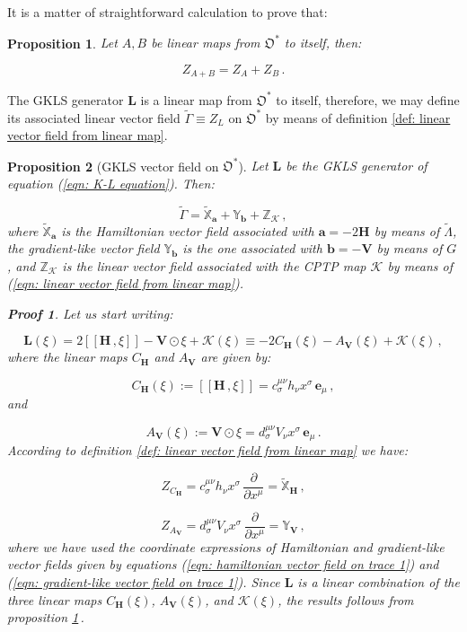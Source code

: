 \documentclass[11pt]{article}
\newcommand{\be}{\begin{equation}}
\newcommand{\ee}{\end{equation}}
\newcommand{\obsp}{\mathfrak{O}}
\newtheorem{prop}{Proposition}
\newtheorem*{pf}{Proof}
\begin{document}
It is a matter of straightforward calculation to  prove that:

\begin{prop}\label{prop: linar combinations of linear maps give rise to linear combinations of linear vector fields}
Let $A,B$ be linear maps from $\obsp^{*}$ to itself, then:

\be
Z_{A+B}=Z_{A} + Z_{B}\,.
\ee
\end{prop}

The GKLS generator $\mathbf{L}$ is a linear map from $\obsp^{*}$ to itself, therefore, we may define its associated linear vector field $\widetilde{\Gamma}\equiv Z_{L}$ on $\obsp^{*}$ by means of definition \ref{def: linear vector field from linear map}.

\begin{prop}[GKLS vector field on $\obsp^{*}$]
Let $\mathbf{L}$ be the GKLS generator of equation (\ref{eqn: K-L equation}).
Then:

\be
\widetilde{\Gamma}= \widetilde{\mathbb{X}}_{\mathbf{a}} + \mathbb{Y}_{\mathbf{b}} + \mathbb{Z}_{\mathcal{K}}\,,
\ee
where $\widetilde{\mathbb{X}}_{\mathbf{a}}$ is the Hamiltonian vector field associated with  $\mathbf{a}= - 2\mathbf{H}$ by means of $\widetilde{\Lambda}$, the gradient-like vector field $\mathbb{Y}_{\mathbf{b}}$ is the one associated with $\mathbf{b}=-\mathbf{V}$ by means of $G$, and $\mathbb{Z}_{\mathcal{K}}$ is the linear vector field associated with the CPTP map $\mathcal{K}$ by means of (\ref{eqn: linear vector field from linear map}).
\begin{pf}
Let us start writing:

\be
\mathbf{L}(\xi)=2\left[\left[\mathbf{H}\,,\xi\right]\right] - \mathbf{V}\odot\xi +\mathcal{K}(\xi) \equiv -2C_{\mathbf{H}}(\xi) - A_{\mathbf{V}}(\xi) + \mathcal{K}(\xi)\,,
\ee
where the linear maps $C_{\mathbf{H}}$ and $A_{\mathbf{V}}$ are given by:

$$
C_{\mathbf{H}}(\xi):=[[\mathbf{H}\,,\xi]]=c^{\mu\nu}_{\sigma}h_{\nu}x^{\sigma}\,\mathbf{e}_{\mu}\,,
$$ 
and

$$
A_{\mathbf{V}}(\xi):=\mathbf{V}\odot\xi=d^{\mu\nu}_{\sigma}V_{\nu}x^{\sigma}\,\mathbf{e}_{\mu}\,.
$$
According to definition \ref{def: linear vector field from linear map} we have:

\be
Z_{C_{\mathbf{H}}}=c^{\mu\nu}_{\sigma}h_{\nu}x^{\sigma}\,\frac{\partial}{\partial x^{\mu}}=\widetilde{\mathbb{X}}_{\mathbf{H}}\,,
\ee

\be
Z_{A_{\mathbf{V}}}=d^{\mu\nu}_{\sigma}V_{\nu}x^{\sigma}\,\frac{\partial}{\partial x^{\mu}}=\mathbb{Y}_{\mathbf{V}}\,,
\ee
where we have used the coordinate expressions of Hamiltonian and gradient-like vector fields given by equations (\ref{eqn: hamiltonian vector field on trace 1}) and (\ref{eqn: gradient-like vector field on trace 1}).
Since $\mathbf{L}$ is a linear combination of the three linear maps $C_{\mathbf{H}}(\xi)$,   $A_{\mathbf{V}}(\xi)$, and $\mathcal{K}(\xi)$, the results follows from proposition \ref{prop: linar combinations of linear maps give rise to linear combinations of linear vector fields}\,.
\end{pf}
\end{prop}
\end{document}
